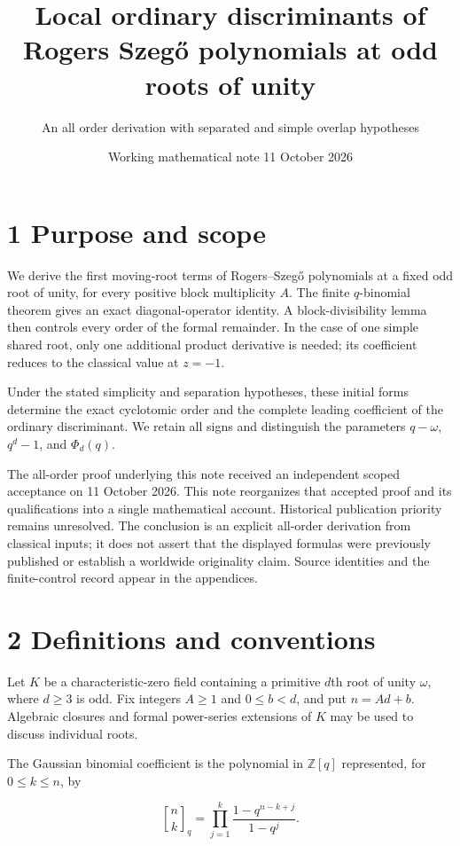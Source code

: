 \documentclass[
  11pt,
]{article}
\title{Local ordinary discriminants of Rogers Szegő polynomials at odd
roots of unity}
\subtitle{An all order derivation with separated and simple overlap
hypotheses}
\author{}
\date{Working mathematical note 11 October 2026}
\begin{document}
\maketitle

\section{1 Purpose and scope}\label{purpose-and-scope}

We derive the first moving-root terms of Rogers--Szegő polynomials at a
fixed odd root of unity, for every positive block multiplicity \(A\).
The finite \(q\)-binomial theorem gives an exact diagonal-operator
identity. A block-divisibility lemma then controls every order of the
formal remainder. In the case of one simple shared root, only one
additional product derivative is needed; its coefficient reduces to the
classical value at \(z=-1\).

Under the stated simplicity and separation hypotheses, these initial
forms determine the exact cyclotomic order and the complete leading
coefficient of the ordinary discriminant. We retain all signs and
distinguish the parameters \(q-\omega\), \(q^d-1\), and \(\Phi_d(q)\).

The all-order proof underlying this note received an independent scoped
acceptance on 11 October 2026. This note reorganizes that accepted proof
and its qualifications into a single mathematical account. Historical
publication priority remains unresolved. The conclusion is an explicit
all-order derivation from classical inputs; it does not assert that the
displayed formulas were previously published or establish a worldwide
originality claim. Source identities and the finite-control record
appear in the appendices.

\section{2 Definitions and
conventions}\label{definitions-and-conventions}

Let \(K\) be a characteristic-zero field containing a primitive \(d\)th
root of unity \(\omega\), where \(d\geq 3\) is odd. Fix integers
\(A\geq 1\) and \(0\leq b<d\), and put \(n=Ad+b\). Algebraic closures
and formal power-series extensions of \(K\) may be used to discuss
individual roots.

The Gaussian binomial coefficient is the polynomial in \(\mathbb Z[q]\)
represented, for \(0\leq k\leq n\), by

\[
\genfrac{[}{]}{0pt}{}{n}{k}_q=\prod_{j=1}^{k}\frac{1-q^{n-k+j}}{1-q^j}.
\]
\end{document}
